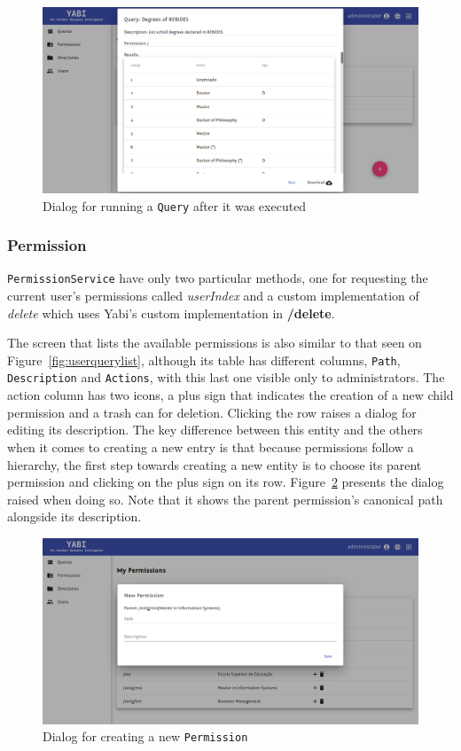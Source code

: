 \begin{figure}
  \centering
  \includegraphics[width=.8\textwidth]{images/screenshots/query/query-post-run}
  \caption{Dialog for running a \texttt{Query} after it was executed}\label{fig:querypostrun}
\end{figure}


\subsubsection{Permission}
\texttt{PermissionService} have only two particular methods, one for requesting the current user's permissions called \textit{userIndex} and a custom implementation of \textit{delete} which uses \gls{Yabi}'s custom implementation in \textbf{/delete}.

The screen that lists the available permissions is also similar to that seen on Figure~\ref{fig:userquerylist}, although its table has different columns, \texttt{Path}, \texttt{Description} and \texttt{Actions}, with this last one visible only to administrators. The action column has two icons, a plus sign that indicates the creation of a new child permission and a trash can for deletion. Clicking the row raises a dialog for editing its description. The key difference between this entity and the others when it comes to creating a new entry is that because permissions follow a hierarchy, the first step towards creating a new entity is to choose its parent permission and clicking on the plus sign on its row. Figure~\ref{fig:permissionnew} presents the dialog raised when doing so. Note that it shows the parent permission's canonical path alongside its description.

\begin{figure}
  \centering
  \includegraphics[width=.8\textwidth]{images/screenshots/permission/permission-new}
  \caption{Dialog for creating a new \texttt{Permission}}\label{fig:permissionnew}
\end{figure}


